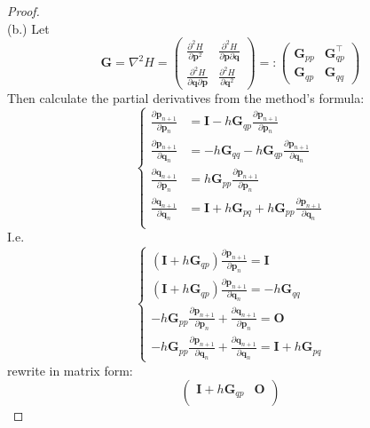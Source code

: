 \documentclass[a4paper, 10pt]{article}
\theoremstyle{definition}
\theoremstyle{hSol}
\begin{document}
\begin{proof}
~\\
(b.) Let 
$$\bm{G} = \nabla^2 H = \begin{pmatrix}
  \frac{\partial^2 H}{\partial \bm{p}^2} & \frac{\partial^2 H}{\partial \bm{p} \partial \bm{q}} \\[6pt]
  \frac{\partial^2 H}{\partial \bm{q} \partial \bm{p}} & \frac{\partial^2 H}{\partial \bm{q}^2}
\end{pmatrix}=:\begin{pmatrix}
  \bm{G}_{pp} & \bm{G}_{qp}^{\top} \\
  \bm{G}_{qp} & \bm{G}_{qq}
\end{pmatrix}
$$ 
Then calculate the partial derivatives from the method's formula:
\begin{equation}
  \begin{cases}
    \tfrac{\partial \bm{p}_{n+1}}{\partial \bm{p}_n} &= \bm{I} - h \bm{G}_{qp}\tfrac{\partial \bm{p}_{n+1}}{\partial \bm{p}_n} \\
    \tfrac{\partial \bm{p}_{n+1}}{\partial \bm{q}_n} &=  - h \bm{G}_{qq} - h \bm{G}_{qp} \tfrac{\partial \bm{p}_{n+1}}{\partial \bm{q}_n}\\
    \tfrac{\partial \bm{q}_{n+1}}{\partial \bm{p}_n} &=  h \bm{G}_{pp} \tfrac{\partial \bm{p}_{n+1}}{\partial \bm{p}_n}\\
    \tfrac{\partial \bm{q}_{n+1}}{\partial \bm{q}_n} &= \bm{I} + h \bm{G}_{pq} + h \bm{G}_{pp} \tfrac{\partial \bm{p}_{n+1}}{\partial \bm{q}_n}\\
  \end{cases}
\end{equation}
I.e.
\begin{equation}
  \begin{cases}
    (\bm{I} + h \bm{G}_{qp}) \tfrac{\partial \bm{p}_{n+1}}{\partial \bm{p}_n} = \bm{I} \\
    (\bm{I} + h \bm{G}_{qp}) \tfrac{\partial \bm{p}_{n+1}}{\partial \bm{q}_n} = -h \bm{G}_{qq} \\
    -h \bm{G}_{pp}\tfrac{\partial \bm{p}_{n+1}}{\partial \bm{p}_n} + \tfrac{\partial \bm{q}_{n+1}}{\partial \bm{p}_n} = \bm{O} \\
    -h \bm{G}_{pp}\tfrac{\partial \bm{p}_{n+1}}{\partial \bm{q}_n} + \tfrac{\partial \bm{q}_{n+1}}{\partial \bm{q}_n} = \bm{I} + h\bm{G}_{pq}
  \end{cases}
\end{equation}
rewrite in matrix form:
\begin{equation}
  \begin{pmatrix}
    \bm{I}+h \bm{G}_{qp} & \bm{O} \\[6pt]

\end{pmatrix}
\end{equation}
\end{proof}
\end{document}
